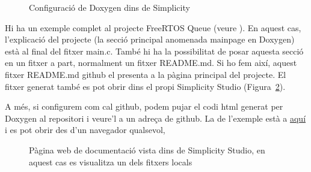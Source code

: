 \begin{figure}
 \centering
 \caption{Configuració de Doxygen dins de Simplicity}
 \label{fig:doxygenconfig}
\end{figure}

Hi ha un exemple complet al projecte FreeRTOS Queue (veure ). En aquest cas, l'explicació del projecte (la secció principal anomenada mainpage en Doxygen) està al final del fitxer main.c. També hi ha la possibilitat de posar aquesta secció en un fitxer a part, normalment un fitxer README.md. Si ho fem així, aquest fitxer README.md github el presenta a la pàgina principal del projecte. El fitxer generat també es pot obrir dins el propi Simplicity Studio (Figura~\ref{fig:doxygeneclipse}).

A més, si configurem com cal github, podem pujar el codi html generat per Doxygen al repositori i veure'l a un adreça de github. La de l'exemple està a \href{https://mariusmm.github.io/cursembedded/Simplicity/FreeRTOS_1/Doc/html/}{aquí} \cite{GITHUBPages} i es pot obrir des d'un navegador qualsevol,

\begin{figure}
 \centering
 \caption{Pàgina web de documentació vista dins de Simplicity Studio, en aquest cas es visualitza un dels fitxers locals}
 \label{fig:doxygeneclipse}
\end{figure}


